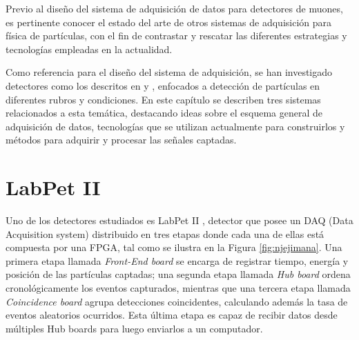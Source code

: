 Previo al diseño del sistema de adquisición de datos para detectores de muones, es pertinente conocer el estado del arte de otros sistemas de adquisición para física de partículas, con el fin de contrastar y rescatar las diferentes estrategias y tecnologías empleadas en la actualidad.

Como referencia para el diseño del sistema de adquisición, se han investigado detectores como los descritos en \cite{Basiladze2017Methods1} y \cite{Basiladze2017Methods2}, enfocados a detección de partículas en diferentes rubros y condiciones. En este capítulo se describen tres sistemas relacionados a esta temática, destacando ideas sobre el esquema general de adquisición de datos, tecnologías que se utilizan actualmente para construirlos y métodos para adquirir y procesar las señales captadas.

\section{LabPet II}
\label{par:labpet}
	Uno de los detectores estudiados es LabPet II \cite{Njejimana2013DesignImaging}, detector que posee un DAQ (Data Acquisition system) distribuido en tres etapas donde cada una de ellas está compuesta por una FPGA, tal como se ilustra en la Figura \ref{fig:njejimana}. Una primera etapa llamada \textit{Front-End board} se encarga de registrar tiempo, energía y posición de las partículas captadas; una segunda etapa llamada \textit{Hub board} ordena cronológicamente los eventos capturados, mientras que una tercera etapa llamada \textit{Coincidence board} agrupa detecciones coincidentes, calculando además la tasa de eventos aleatorios ocurridos. Esta última etapa es capaz de recibir datos desde múltiples Hub boards para luego enviarlos a un computador.
	
	
